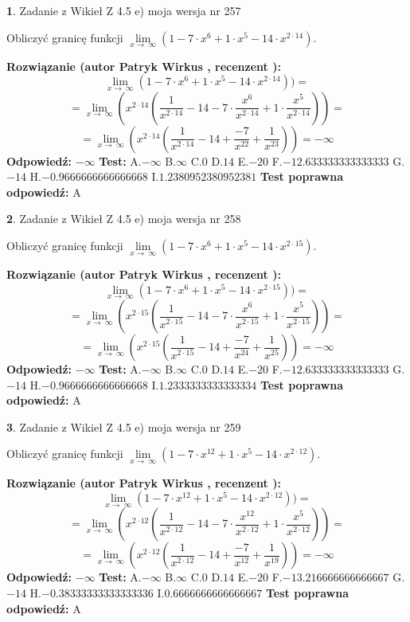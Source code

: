 \documentclass[12pt, a4paper]{article}
\theoremstyle{definition} %
\newtheorem{zad}{}
\newcommand{\zadStart}[1]{\begin{zad}#1\newline}
\newcommand{\zadStop}{\end{zad}}
\newcommand{\rozwStart}[2]{\noindent \textbf{Rozwiązanie (autor #1 , recenzent #2): }\newline}
\newcommand{\rozwStop}{\newline}
\newcommand{\odpStart}{\noindent \textbf{Odpowiedź:}\newline}
\newcommand{\odpStop}{\newline}
\newcommand{\testStart}{\noindent \textbf{Test:}\newline}
\newcommand{\testStop}{\newline}
\newcommand{\kluczStart}{\noindent \textbf{Test poprawna odpowiedź:}\newline}
\newcommand{\kluczStop}{\newline}
\begin{document}
\zadStart{Zadanie z Wikieł Z 4.5 e) moja wersja nr 257}


Obliczyć granicę funkcji  $\lim\limits_{x\to\ \infty}(1 - 7 \cdot x^{6}+1 \cdot x^{5}- 14 \cdot x^{2\cdot14})$.
\zadStop
\rozwStart{Patryk Wirkus}{}
$$\lim\limits_{x\to\ \infty}(1 - 7 \cdot x^{6}+1 \cdot x^{5}- 14 \cdot x^{2\cdot14}))=$$
$$=\lim\limits_{x\to\ \infty}(x^{2\cdot14}(\frac{1}{x^{2\cdot14}}-14 -7 \cdot \frac{x^{6}}{x^{2\cdot14}}+1 \cdot \frac{x^{5}}{x^{2\cdot14}}))=$$
$$=\lim\limits_{x\to\ \infty}(x^{2\cdot14}(\frac{1}{x^{2\cdot14}}-14 + \frac{-7}{x^{22}}+ \frac{1}{x^{23}}))=-\infty$$
\rozwStop
\odpStart
$-\infty$
\odpStop
\testStart
A.$-\infty$ B.$\infty$ C.$0$ D.$14$ E.$-20$
F.$-12.633333333333333$ G.$-14$
H.$-0.9666666666666668$
I.$1.2380952380952381$
\testStop
\kluczStart
A
\kluczStop



\zadStart{Zadanie z Wikieł Z 4.5 e) moja wersja nr 258}


Obliczyć granicę funkcji  $\lim\limits_{x\to\ \infty}(1 - 7 \cdot x^{6}+1 \cdot x^{5}- 14 \cdot x^{2\cdot15})$.
\zadStop
\rozwStart{Patryk Wirkus}{}
$$\lim\limits_{x\to\ \infty}(1 - 7 \cdot x^{6}+1 \cdot x^{5}- 14 \cdot x^{2\cdot15}))=$$
$$=\lim\limits_{x\to\ \infty}(x^{2\cdot15}(\frac{1}{x^{2\cdot15}}-14 -7 \cdot \frac{x^{6}}{x^{2\cdot15}}+1 \cdot \frac{x^{5}}{x^{2\cdot15}}))=$$
$$=\lim\limits_{x\to\ \infty}(x^{2\cdot15}(\frac{1}{x^{2\cdot15}}-14 + \frac{-7}{x^{24}}+ \frac{1}{x^{25}}))=-\infty$$
\rozwStop
\odpStart
$-\infty$
\odpStop
\testStart
A.$-\infty$ B.$\infty$ C.$0$ D.$14$ E.$-20$
F.$-12.633333333333333$ G.$-14$
H.$-0.9666666666666668$
I.$1.2333333333333334$
\testStop
\kluczStart
A
\kluczStop



\zadStart{Zadanie z Wikieł Z 4.5 e) moja wersja nr 259}


Obliczyć granicę funkcji  $\lim\limits_{x\to\ \infty}(1 - 7 \cdot x^{12}+1 \cdot x^{5}- 14 \cdot x^{2\cdot12})$.
\zadStop
\rozwStart{Patryk Wirkus}{}
$$\lim\limits_{x\to\ \infty}(1 - 7 \cdot x^{12}+1 \cdot x^{5}- 14 \cdot x^{2\cdot12}))=$$
$$=\lim\limits_{x\to\ \infty}(x^{2\cdot12}(\frac{1}{x^{2\cdot12}}-14 -7 \cdot \frac{x^{12}}{x^{2\cdot12}}+1 \cdot \frac{x^{5}}{x^{2\cdot12}}))=$$
$$=\lim\limits_{x\to\ \infty}(x^{2\cdot12}(\frac{1}{x^{2\cdot12}}-14 + \frac{-7}{x^{12}}+ \frac{1}{x^{19}}))=-\infty$$
\rozwStop
\odpStart
$-\infty$
\odpStop
\testStart
A.$-\infty$ B.$\infty$ C.$0$ D.$14$ E.$-20$
F.$-13.216666666666667$ G.$-14$
H.$-0.38333333333333336$
I.$0.6666666666666667$
\testStop
\kluczStart
A
\kluczStop
\end{document}

